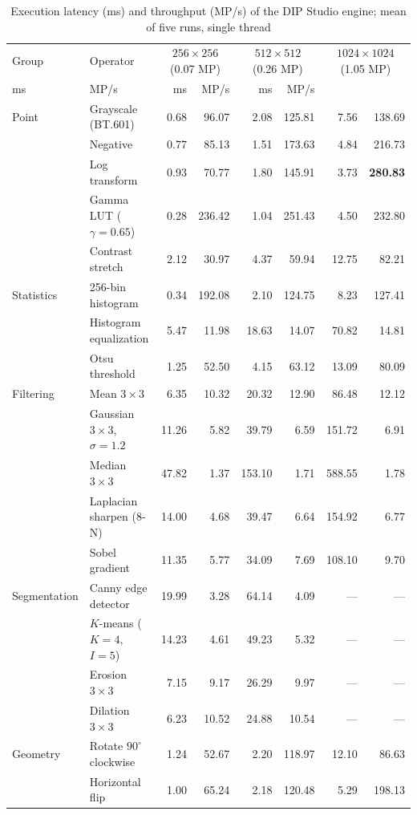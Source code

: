 \documentclass[journal]{IEEEtran}
\begin{document}
\begin{table}[!t]
\centering
\caption{Execution latency (ms) and throughput (MP/s) of the DIP Studio engine; mean of five runs, single thread}
\label{tab:bench}
\begin{tabular}{llrrrrrr}
\toprule
Group & Operator & \multicolumn{2}{c}{$256\times256$ (0.07 MP)} & \multicolumn{2}{c}{$512\times512$ (0.26 MP)} & \multicolumn{2}{c}{$1024\times1024$ (1.05 MP)} \\
ms & MP/s & ms & MP/s & ms & MP/s \\
\midrule
Point & Grayscale (BT.601) & 0.68 & 96.07 & 2.08 & 125.81 & 7.56 & 138.69 \\
 & Negative & 0.77 & 85.13 & 1.51 & 173.63 & 4.84 & 216.73 \\
 & Log transform & 0.93 & 70.77 & 1.80 & 145.91 & 3.73 & \textbf{280.83} \\
 & Gamma LUT ($\gamma=0.65$) & 0.28 & 236.42 & 1.04 & 251.43 & 4.50 & 232.80 \\
 & Contrast stretch & 2.12 & 30.97 & 4.37 & 59.94 & 12.75 & 82.21 \\
\addlinespace[2pt]
Statistics & 256-bin histogram & 0.34 & 192.08 & 2.10 & 124.75 & 8.23 & 127.41 \\
 & Histogram equalization & 5.47 & 11.98 & 18.63 & 14.07 & 70.82 & 14.81 \\
 & Otsu threshold & 1.25 & 52.50 & 4.15 & 63.12 & 13.09 & 80.09 \\
\addlinespace[2pt]
Filtering & Mean $3\times3$ & 6.35 & 10.32 & 20.32 & 12.90 & 86.48 & 12.12 \\
 & Gaussian $3\times3$, $\sigma=1.2$ & 11.26 & 5.82 & 39.79 & 6.59 & 151.72 & 6.91 \\
 & Median $3\times3$ & 47.82 & 1.37 & 153.10 & 1.71 & 588.55 & 1.78 \\
 & Laplacian sharpen (8-N) & 14.00 & 4.68 & 39.47 & 6.64 & 154.92 & 6.77 \\
 & Sobel gradient & 11.35 & 5.77 & 34.09 & 7.69 & 108.10 & 9.70 \\
\addlinespace[2pt]
Segmentation & Canny edge detector & 19.99 & 3.28 & 64.14 & 4.09 & --- & --- \\
 & $K$-means ($K=4$, $I=5$) & 14.23 & 4.61 & 49.23 & 5.32 & --- & --- \\
 & Erosion $3\times3$ & 7.15 & 9.17 & 26.29 & 9.97 & --- & --- \\
 & Dilation $3\times3$ & 6.23 & 10.52 & 24.88 & 10.54 & --- & --- \\
\addlinespace[2pt]
Geometry & Rotate $90^{\circ}$ clockwise & 1.24 & 52.67 & 2.20 & 118.97 & 12.10 & 86.63 \\
 & Horizontal flip & 1.00 & 65.24 & 2.18 & 120.48 & 5.29 & 198.13 \\
\bottomrule
\end{tabular}
\end{table}
\end{document}
